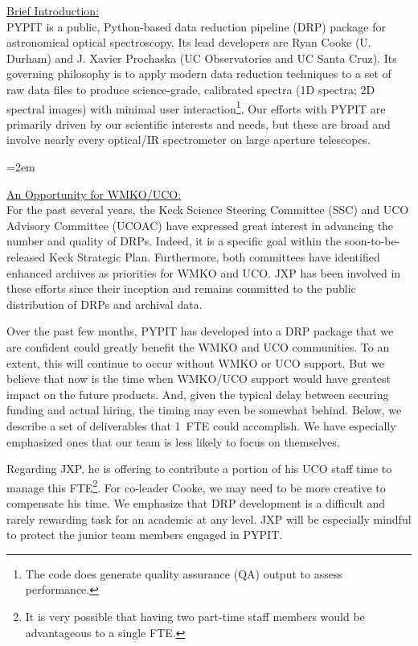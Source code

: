 \documentclass[11pt,preprint]{aastex}
\begin{document}
\vskip 0.2in

{}
\noindent
\uline{Brief Introduction:} \\
PYPIT is a public, Python-based data reduction pipeline
(DRP) package for astronomical optical spectroscopy.
Its lead developers are Ryan Cooke (U. Durham) and 
J. Xavier Prochaska (UC Observatories and UC Santa Cruz).
Its governing philosophy is to apply modern data reduction
techniques to a set of raw data files to produce
science-grade, calibrated spectra (1D spectra; 2D spectral
images) with minimal user interaction\footnote{The code
does generate quality assurance (QA) output to assess
performance.}.  Our efforts with PYPIT are primarily driven by 
our scientific interests and needs, but these
are broad and involve nearly every optical/IR spectrometer
on large aperture telescopes.

\parindent=2em

\vskip 0.2in

\noindent 
\uline{An Opportunity for WMKO/UCO:} \\
For the past several years, the Keck Science Steering
Committee (SSC) and UCO Advisory Committee (UCOAC)
have expressed great interest in advancing the number
and quality of DRPs.  Indeed, it is a specific goal
within the soon-to-be-released Keck Strategic Plan.
Furthermore, both committees have identified enhanced
archives as priorities for WMKO and UCO.
JXP has been involved in these efforts since their 
inception and remains committed to the public distribution
of DRPs and archival data.

Over the past few months, PYPIT has developed into a 
DRP package that we are confident could greatly 
benefit the WMKO and UCO communities.  To an extent, 
this will continue to occur without WMKO or UCO support.
But we believe that now is the time when WMKO/UCO support
would have greatest impact on the future products.
And, given the typical delay between securing funding and
actual hiring,  the timing may even be somewhat behind.
Below, we describe a set of deliverables that 1~FTE could
accomplish.  We have especially emphasized ones that our 
team is less likely to focus on themselves.

Regarding JXP, he is offering to contribute a portion of his
UCO staff time to manage this FTE\footnote{It is very possible
that having two part-time staff members would be advantageous
to a single FTE.}.  For co-leader Cooke, we may need to
be more creative to compensate his time.
We emphasize that DRP development is a difficult and
rarely rewarding task for an academic at any level.
JXP will be especially mindful to protect the junior 
team members engaged in PYPIT.
\end{document}
